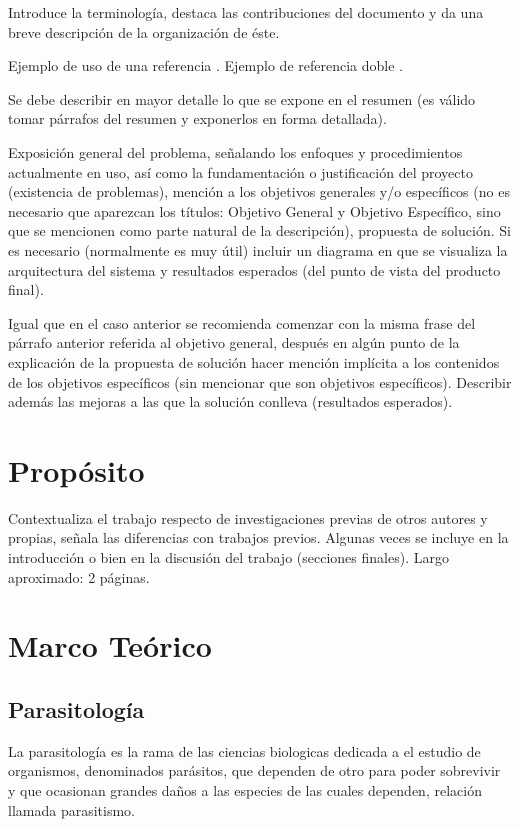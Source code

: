 \documentclass[letter,12pt]{report}
\begin{document}
Introduce la terminología, destaca las contribuciones del documento y da una breve descripción de la organización de éste.

Ejemplo de uso de una referencia \cite{c02}. Ejemplo de referencia doble \cite{c02}.


Se debe describir en mayor detalle lo que se expone en el resumen (es válido tomar párrafos del resumen y exponerlos en forma detallada).

Exposición general del problema, señalando los enfoques y procedimientos actualmente en uso, así como la fundamentación o justificación del proyecto (existencia de problemas), mención a los objetivos generales y/o específicos (no es necesario que aparezcan los títulos: Objetivo General y Objetivo Específico, sino que se mencionen como parte natural de la descripción), propuesta de solución. Si es necesario (normalmente es muy útil) incluir un diagrama en que se visualiza la arquitectura del sistema y resultados esperados (del punto de vista del producto final).

Igual que en el caso anterior se recomienda comenzar con la misma frase del párrafo anterior referida al objetivo general, después en algún punto de la explicación de la propuesta de solución hacer mención implícita a los contenidos de los objetivos específicos (sin mencionar que son objetivos específicos). Describir además las mejoras a las que la solución conlleva (resultados esperados).


\section{Propósito}
Contextualiza el trabajo respecto de investigaciones previas de otros autores y propias, señala las diferencias con trabajos previos. Algunas veces se incluye en la introducción o bien en la discusión del trabajo (secciones finales). Largo aproximado: 2 páginas.

\section{Marco Teórico}
\subsection{Parasitología}
La parasitología \cite{c02} es la rama de las ciencias biologicas dedicada a el estudio de
organismos, denominados parásitos, que dependen de otro para poder sobrevivir y que
ocasionan grandes daños a las especies de las cuales dependen, relación llamada
parasitismo.
\end{document}
